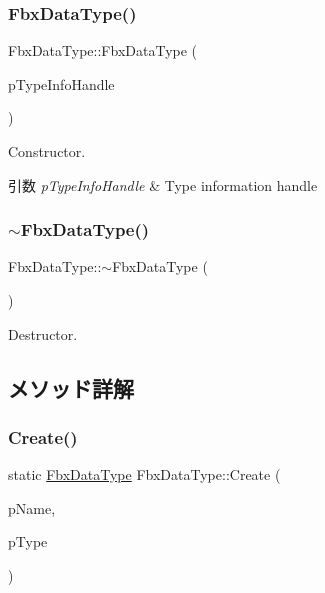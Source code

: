 \subsubsection{\texorpdfstring{Fbx\+Data\+Type()}{FbxDataType()}\hspace{0.1cm}{\footnotesize\ttfamily [3/3]}}
{\footnotesize\ttfamily Fbx\+Data\+Type\+::\+Fbx\+Data\+Type (\begin{DoxyParamCaption}\item[{const \hyperlink{class_fbx_property_handle}{Fbx\+Property\+Handle} \&}]{p\+Type\+Info\+Handle }\end{DoxyParamCaption})}

Constructor. 
\begin{DoxyParams}{引数}
{\em p\+Type\+Info\+Handle} & Type information handle \\
\hline
\end{DoxyParams}
\mbox{\label{class_fbx_data_type_aaad8ea35e6b315bd3346c453825183e1}} 
\subsubsection{\texorpdfstring{$\sim$\+Fbx\+Data\+Type()}{~FbxDataType()}}
{\footnotesize\ttfamily Fbx\+Data\+Type\+::$\sim$\+Fbx\+Data\+Type (\begin{DoxyParamCaption}{ }\end{DoxyParamCaption})}



Destructor. 



\subsection{メソッド詳解}
\mbox{\label{class_fbx_data_type_a9b5a7c24721bb0d633d12a94e523fee3}} 
\subsubsection{\texorpdfstring{Create()}{Create()}\hspace{0.1cm}{\footnotesize\ttfamily [1/2]}}
{\footnotesize\ttfamily static \hyperlink{class_fbx_data_type}{Fbx\+Data\+Type} Fbx\+Data\+Type\+::\+Create (\begin{DoxyParamCaption}\item[{const char $\ast$}]{p\+Name,  }\item[{const \hyperlink{fbxpropertytypes_8h_a73913a5ddfb20e57c6f25e9e6784bd92}{E\+Fbx\+Type}}]{p\+Type }\end{DoxyParamCaption})\hspace{0.3cm}{\ttfamily [static]}}

